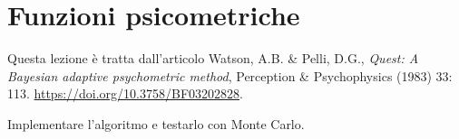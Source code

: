 
\section{Funzioni psicometriche}

Questa lezione è tratta dall'articolo
Watson, A.B. \& Pelli, D.G., \emph{Quest: A Bayesian adaptive psychometric method}, Perception \& Psychophysics (1983) 33: 113. \url{https://doi.org/10.3758/BF03202828}.

\begin{exercise}
	Implementare l'algoritmo e testarlo con Monte Carlo.
\end{exercise}
